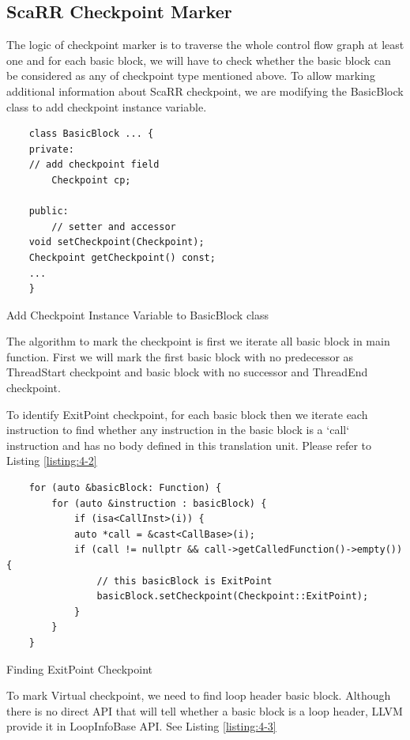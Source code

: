 \subsection{ScaRR Checkpoint Marker}

The logic of checkpoint marker is to traverse the whole control flow graph at least one and for each basic block, we will have to check whether the basic block can be considered as any of checkpoint type mentioned above. To allow marking additional information about ScaRR checkpoint, we are modifying the BasicBlock class to add checkpoint instance variable.

\begin{listing}
\begin{verbatim}
    class BasicBlock ... {
    private:
    // add checkpoint field
        Checkpoint cp;

    public:
        // setter and accessor
    void setCheckpoint(Checkpoint);
    Checkpoint getCheckpoint() const;
    ...
    }
\end{verbatim}
\caption{Add Checkpoint Instance Variable to BasicBlock class}    
\label{listing:4-1}
\end{listing}

The algorithm to mark the checkpoint is first we iterate all basic block in main function. First we will mark the first basic block with no predecessor as ThreadStart checkpoint and basic block with no successor and ThreadEnd checkpoint. 

To identify ExitPoint checkpoint, for each basic block then we iterate  each instruction to find whether any instruction in the basic block is a `call` instruction and has no body defined in this translation unit. Please refer to Listing \ref{listing:4-2}

\begin{listing}
\begin{verbatim}
    for (auto &basicBlock: Function) {
        for (auto &instruction : basicBlock) {
            if (isa<CallInst>(i)) {
            auto *call = &cast<CallBase>(i);
            if (call != nullptr && call->getCalledFunction()->empty()) {
                // this basicBlock is ExitPoint
                basicBlock.setCheckpoint(Checkpoint::ExitPoint);
            } 
        }
    } 
\end{verbatim}
\caption{Finding ExitPoint Checkpoint}    
\label{listing:4-2}
\end{listing}

To mark Virtual checkpoint, we need to find loop header basic block. Although there is no direct API that will tell whether a basic block is a loop header, LLVM provide it in LoopInfoBase API. See Listing \ref{listing:4-3}

